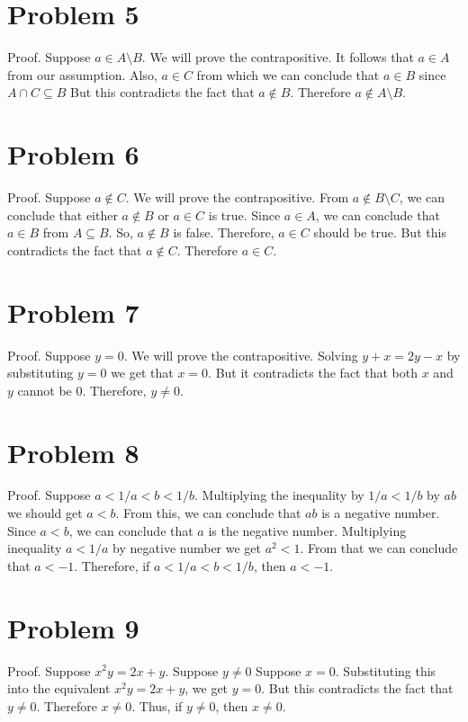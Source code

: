 \documentclass{article}
\begin{document}
\section{Problem 5}

Proof. Suppose $a \in A \setminus B$. We will prove the
contrapositive. It follows that $a \in A$ from our assumption. Also,
$a \in C$ from which we can conclude that $a \in B$ since $A \cap C
\subseteq B$ But this contradicts the fact that $a \notin B$.
Therefore $a \notin A \setminus B$.

\section{Problem 6}

Proof. Suppose $a \notin C$. We will prove the contrapositive. From $a
\notin B \setminus C$, we can conclude that either $a \notin B$ or $a
\in C$ is true. Since $a \in A$, we can conclude that $a \in B$ from
$A \subseteq B$. So, $a \notin B$ is false. Therefore, $a \in C$
should be true. But this contradicts the fact that $a \notin C$.
Therefore $a \in C$.

\section{Problem 7}

Proof. Suppose $y = 0$. We will prove the contrapositive. Solving $y +
x = 2y - x$ by substituting $y=0$ we get that $x=0$. But it
contradicts the fact that both $x$ and $y$ cannot be $0$. Therefore,
$y \neq 0$.

\section{Problem 8}

Proof. Suppose $a < 1/a < b < 1/b$. Multiplying  the inequality by
$1/a < 1/b$ by $ab$ we should get $a < b$. From this, we can conclude
that $ab$ is a negative number. Since $a < b$, we can conclude that
$a$ is the negative number. Multiplying inequality $a < 1/a$ by
negative number we get $a^2 < 1$. From that we can conclude that $a <
-1$. Therefore, if $a < 1/a < b < 1/b$, then $a < -1$.

\section{Problem 9}

Proof. Suppose $x^2y = 2x + y$. Suppose $y \neq 0$ Suppose $x = 0$.
Substituting this into the equivalent $x^2y = 2x + y$, we get $y = 0$.
But this contradicts the fact that $y \neq 0$. Therefore $x \neq 0$.
Thus, if $y \neq 0$, then $x \neq 0$.
\end{document}
